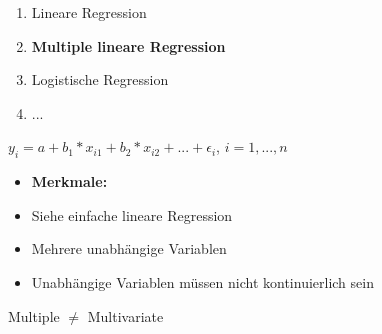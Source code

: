 \documentclass[aspectratio=169, journal, x11names, unknownkeysallowed, hyperref={colorlinks,
linkcolor = SS2,
urlcolor  = F3,
citecolor = F3,
anchorcolor = A4}, 12pt]{beamer}
\begin{document}
    \begin{frame}[t]
      \begin{minipage}{0.45\textwidth}
        \begin{enumerate}
          \item Lineare Regression
          \item \textbf{Multiple lineare Regression}
          \item Logistische Regression
          \item ...
        \end{enumerate}
    \end{minipage}%
    \begin{minipage}[t]{0.45\textwidth}
      \begin{tcolorbox}
        \begin{center}
          $y_i = a + b_1 * x_{i1} + b_2 * x_{i2} + ... + \epsilon_i$, $i = 1, ..., n$
          \end{center}
        \end{tcolorbox}
      \begin{itemize}
        \item[] \textbf{Merkmale:}
        \item Siehe einfache lineare Regression
        \item Mehrere unabhängige Variablen
        \item Unabhängige Variablen müssen nicht kontinuierlich sein
      \end{itemize}
      \begin{tcolorbox}[title=Achtung!, colframe=red!80!black, colback=orange!25]
        \centering
        Multiple $\neq$ Multivariate
      \end{tcolorbox}
    \end{minipage}
    \end{frame}
\end{document}

